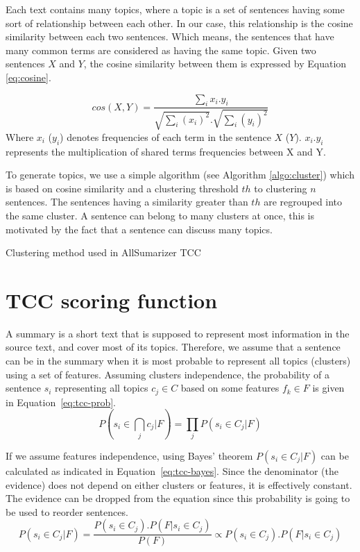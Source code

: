 Each text contains many topics, where a topic is a set of sentences having some sort of relationship between each other.
In our case, this relationship is the cosine similarity between each two sentences. 
Which means, the sentences that have many common terms are considered as having the same topic. 
Given two sentences $ X $ and $ Y $, the cosine similarity between them is expressed by Equation \ref{eq:cosine}.

\begin{equation}
\label{eq:cosine}
cos(X,Y) = \frac {\sum_i {x_i.y_i} }
{\sqrt{\sum_i(x_i)^2} . \sqrt{\sum_i(y_i)^2}}
\end{equation}
Where $ x_i $ ($ y_i $) denotes frequencies of each term in the sentence $ X $ ($ Y $).
$x_i.y_i$ represents the multiplication of shared terms frequencies between X and Y.


To generate topics, we use a simple algorithm (see Algorithm  \ref{algo:cluster}) which is based on cosine similarity and a clustering threshold $ th $ to clustering $ n $ sentences.
The sentences having a similarity greater than $ th $ are regrouped into the same cluster. 
A sentence can belong to many clusters at once, this is motivated by the fact that a sentence can discuss many topics.

\begin{algorithm}[!ht]
	\caption{Clustering method used in AllSumarizer TCC}
	\label{algo:cluster}
\end{algorithm}



\section{TCC scoring function}

A summary is a short text that is supposed to represent most information in the source text, and cover most of its topics.
Therefore, we assume that a sentence can be in the summary when it is most probable to represent all topics (clusters)  using a set of features.
Assuming clusters independence, the probability of a sentence $ s_i $ representing all topics $ c_j \in C $ based on some features $ f_k \in F $ is given in Equation~\ref{eq:tcc-prob}. 
\begin{equation}
\label{eq:tcc-prob}
P(s_i \in \bigcap_{j} c_j | F) = 
\prod_{j} P(s_i \in C_j | F)
\end{equation}

If we assume features independence, using Bayes' theorem $ P(s_i \in C_j | F) $ can be calculated as indicated in Equation~\ref{eq:tcc-bayes}. 
Since the denominator (the evidence) does not depend on either clusters or features, it is effectively constant.
The evidence can be dropped from the equation since this probability is going to be used to reorder sentences.
\begin{equation}
\label{eq:tcc-bayes}
P(s_i \in C_j | F) = 
\frac{P(s_i \in C_j) . P(F | s_i \in C_j) }{P(F)} 
\propto 
P(s_i \in C_j) . P(F | s_i \in C_j)
\end{equation}

